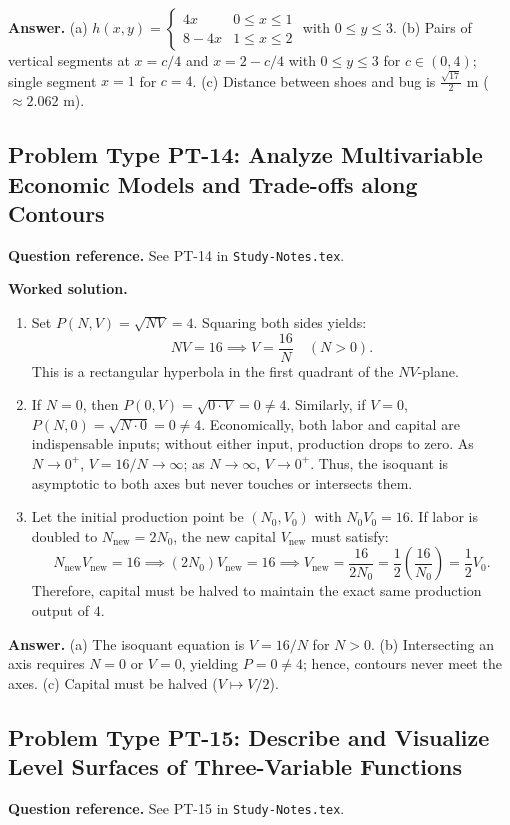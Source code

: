 \documentclass[11pt,letterpaper]{article}
\begin{document}
\textbf{Answer.}
(a) $h(x,y) = \begin{cases} 4x & 0 \le x \le 1 \\ 8 - 4x & 1 \le x \le 2 \end{cases}$ with $0 \le y \le 3$.
(b) Pairs of vertical segments at $x = c/4$ and $x = 2 - c/4$ with $0 \le y \le 3$ for $c \in (0,4)$; single segment $x=1$ for $c=4$.
(c) Distance between shoes and bug is $\frac{\sqrt{17}}{2}$ m ($\approx 2.062$ m).

\subsection{Problem Type PT-14: Analyze Multivariable Economic Models and Trade-offs along Contours}
\textbf{Question reference.} See PT-14 in \texttt{Study-Notes.tex}.

\textbf{Worked solution.}
\begin{enumerate}[label=(\alph*),leftmargin=*]
    \item Set $P(N,V) = \sqrt{NV} = 4$.
    Squaring both sides yields:
    \[ NV = 16 \implies V = \frac{16}{N} \quad (N > 0). \]
    This is a rectangular hyperbola in the first quadrant of the $NV$-plane.
    \item If $N = 0$, then $P(0,V) = \sqrt{0 \cdot V} = 0 \ne 4$. Similarly, if $V = 0$, $P(N,0) = \sqrt{N \cdot 0} = 0 \ne 4$.
    Economically, both labor and capital are indispensable inputs; without either input, production drops to zero. As $N \to 0^+$, $V = 16/N \to \infty$; as $N \to \infty$, $V \to 0^+$. Thus, the isoquant is asymptotic to both axes but never touches or intersects them.
    \item Let the initial production point be $(N_0, V_0)$ with $N_0 V_0 = 16$.
    If labor is doubled to $N_{\text{new}} = 2N_0$, the new capital $V_{\text{new}}$ must satisfy:
    \[ N_{\text{new}} V_{\text{new}} = 16 \implies (2N_0) V_{\text{new}} = 16 \implies V_{\text{new}} = \frac{16}{2N_0} = \frac{1}{2}\left(\frac{16}{N_0}\right) = \frac{1}{2}V_0. \]
    Therefore, capital must be halved to maintain the exact same production output of $4$.
\end{enumerate}

\textbf{Answer.}
(a) The isoquant equation is $V = 16/N$ for $N > 0$.
(b) Intersecting an axis requires $N=0$ or $V=0$, yielding $P=0 \ne 4$; hence, contours never meet the axes.
(c) Capital must be halved ($V \mapsto V/2$).

\subsection{Problem Type PT-15: Describe and Visualize Level Surfaces of Three-Variable Functions}
\textbf{Question reference.} See PT-15 in \texttt{Study-Notes.tex}.
\end{document}
